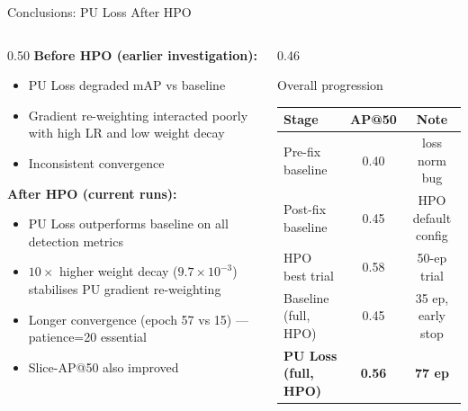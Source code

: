 \documentclass[aspectratio=169, 10pt]{beamer}
\begin{document}
\begin{frame}{Conclusions: PU Loss After HPO}
  \begin{columns}[T]
    \begin{column}{0.50\textwidth}
      \textbf{Before HPO (earlier investigation):}
      \begin{itemize}\small
        \item PU Loss degraded mAP vs baseline
        \item Gradient re-weighting interacted poorly with high LR and low weight decay
        \item Inconsistent convergence
      \end{itemize}

      \vspace{8pt}
      \textbf{After HPO (current runs):}
      \begin{itemize}\small
        \item PU Loss outperforms baseline on all detection metrics
        \item $10\times$ higher weight decay ($9.7 \times 10^{-3}$) stabilises PU gradient re-weighting
        \item Longer convergence (epoch 57 vs 15) — patience=20 essential
        \item Slice-AP@50 also improved
      \end{itemize}
    \end{column}
    \begin{column}{0.46\textwidth}
      \vspace{2pt}
      \begin{block}{\small Overall progression}
        \small
        \begin{tabular}{lcc}
          \toprule
          Stage & AP@50 & Note \\
          \midrule
          Pre-fix baseline     & 0.40 & loss norm bug \\
          Post-fix baseline    & 0.45 & HPO default config \\
          HPO best trial       & 0.58 & 50-ep trial \\
          \rowcolor{rowhl}
          Baseline (full, HPO) & 0.45 & 35 ep, early stop \\
          \rowcolor{rowhl}
          \textbf{PU Loss (full, HPO)} & \textbf{0.56} & \textbf{77 ep} \\
          \bottomrule
        \end{tabular}
      \end{block}


\end{column}
\end{columns}
\end{frame}
\end{document}
